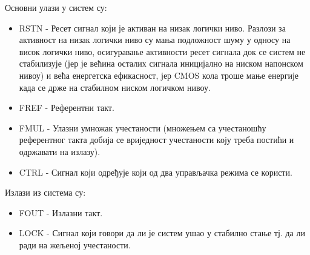 \documentclass[master]{finthesis}
\begin{document}

\vspace{0.7cm} %
Основни улази у систем су:
\begin{itemize}
	\item RSTN - Ресет сигнал који је активан на низак логички ниво. Разлози за активност на низак логички ниво су мања подложност шуму у односу на висок логички ниво, осигуравање активности ресет сигнала док се систем не стабилизује (јер је већина осталих сигнала иницијално на ниском напонском нивоу) и већа енергетска ефикасност, јер CMOS кола троше мање енергије када се држе на стабилном ниском логичком нивоу.  
	\item FREF - Референтни такт.
	\item FMUL - Улазни умножак учестаности (множењем са учестаношћу референтног такта добија се вриједност учестаности коју треба постићи и одржавати на излазу).
	\item CTRL - Сигнал који одређује који од два управљачка режима се користи.
\end{itemize}
Излази из система су:
\begin{itemize}
	\item FOUT - Излазни такт.
	\item LOCK - Сигнал који говори да ли је систем ушао у стабилно стање тј. да ли ради на жељеној учестаности.
\end{itemize}
\end{document}
